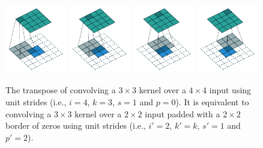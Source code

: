 \begin{figure}[p]
    \centering
    \includegraphics[width=0.24\textwidth]{pdf/no_padding_no_strides_transposed_00.pdf}
    \includegraphics[width=0.24\textwidth]{pdf/no_padding_no_strides_transposed_01.pdf}
    \includegraphics[width=0.24\textwidth]{pdf/no_padding_no_strides_transposed_02.pdf}
    \includegraphics[width=0.24\textwidth]{pdf/no_padding_no_strides_transposed_03.pdf}
    \caption{\label{fig:no_padding_no_strides_transposed} The transpose of
        convolving a $3 \times 3$ kernel over a $4 \times 4$ input using unit
        strides (i.e., $i = 4$, $k = 3$, $s = 1$ and $p = 0$). It is equivalent
        to convolving a $3 \times 3$ kernel over a $2 \times 2$ input padded
        with a $2 \times 2$ border of zeros using unit strides (i.e., $i' = 2$,
        $k' = k$, $s' = 1$ and $p' = 2$).}
\end{figure}

